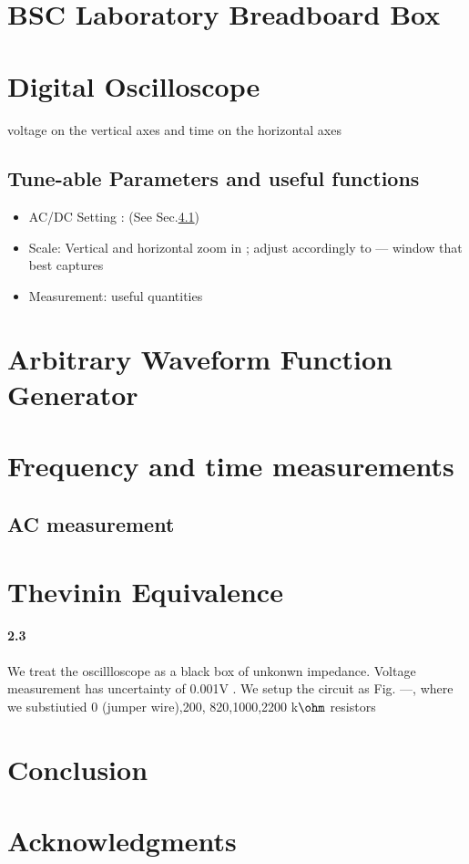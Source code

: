 \documentclass[10pt,letterpaper,oneside] {article}
\begin{document}
\section{BSC Laboratory Breadboard Box}

\section{Digital Oscilloscope}
voltage on the vertical axes and time on the horizontal axes
\subsection{Tune-able Parameters and useful functions}
\begin{itemize}
\item AC/DC Setting : (See Sec.\ref{sec:acdc})
\item Scale: Vertical and horizontal zoom in ; adjust accordingly to --- window that best captures
\item Measurement: useful quantities 
\end{itemize}
\section{Arbitrary Waveform Function Generator}
\section{Frequency and time measurements}
\subsection{AC measurement}\label{sec:acdc}
\section{Thevinin Equivalence}
\paragraph{\textbf{2.3}}
We treat  the oscillloscope as a black box of unkonwn impedance. Voltage measurement has uncertainty of 0.001V . 
We setup the circuit as Fig. ---, where we substiutied 0 (jumper wire),200, 820,1000,2200 k$\ohm$ resistors
 \section{Conclusion}
\section{Acknowledgments}


\end{document}
